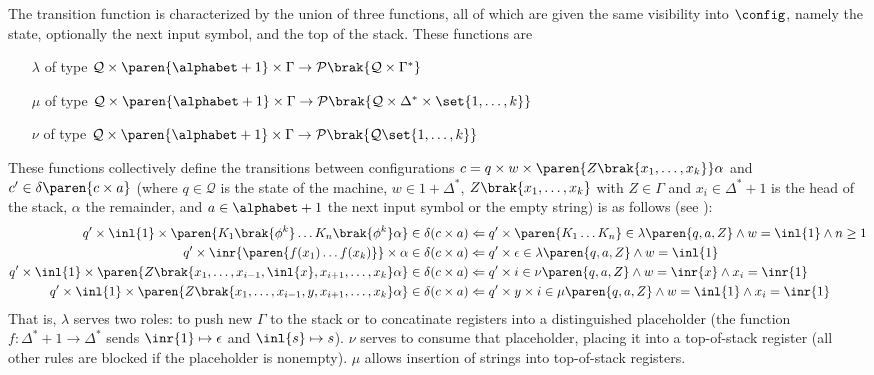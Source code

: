 The transition function is characterized by the union of three functions,
all of which are given the same visibility into $\config$, namely the state,
optionally the next input symbol, and the top of the stack.  These functions
are
%
\begin{itemize}
%
	\item[$\lambda$] of type $\mathcal{Q} \times \paren{\alphabet + 1} \times
	\Gamma \to \mathcal{P}\brak{ \mathcal{Q} \times \Gamma^* }$
%
	\item[$\mu$] of type $\mathcal{Q} \times \paren{\alphabet + 1} \times
	\Gamma \to \mathcal{P}\brak{ \mathcal{Q} \times \Delta^* \times
	\set{1,\ldots,k} }$
%
	\item[$\nu$] of type $\mathcal{Q} \times \paren{\alphabet + 1} \times
	\Gamma \to \mathcal{P}\brak{ \mathcal{Q} \set{1,\ldots,k} }$
%
\end{itemize}
%
These functions collectively define the transitions between configurations
$c = q \times w \times \paren{Z\brak{x_1,\ldots,x_k}}\alpha$ and $c' \in
\delta\paren{c \times a}$ (where $q \in \mathcal{Q}$ is the state of the
machine, $w \in 1 + \Delta^*$, $Z\brak{x_1,\ldots,x_k}$ with $Z \in \Gamma$
and $x_i \in \Delta^* + 1$ is the head of the stack, $\alpha$ the
remainder, and $a \in \alphabet + 1$ the next input symbol or the empty string)
is as follows (see \cite[p.  48]{aho:pa}):
%
\begin{align*}
	q'\times \inl{1} \times \paren{K_1\brak{\phi^k} \ldots K_n\brak{\phi^k} \alpha} \in\delta (c \times a)
%
	&\Leftarrow q' \times \paren{K_1 \ldots K_n} \in \lambda\paren{q,a, Z} \wedge w = \inl{1} \wedge n \ge 1 \\
%
	q'\times \inr{\paren{f(x_1) \ldots f(x_k)}} \times \alpha \in \delta (c \times a)
%
	&\Leftarrow q' \times \epsilon \in \lambda\paren{q,a, Z} \wedge w = \inl{1} \\
%
	q'\times \inl{1} \times \paren{Z\brak{x_1,\ldots,x_{i-1},\inl{x},x_{i+1},\ldots,x_k}\alpha} \in\delta (c \times a)
%
	&\Leftarrow q' \times i \in \nu\paren{q,a, Z} \wedge w = \inr{x} \wedge x_i = \inr{1} \\
%
	q'\times \inl{1} \times \paren{Z\brak{x_1,\ldots,x_{i-1},y,x_{i+1},\ldots,x_k}\alpha} \in\delta (c \times a)
%
	&\Leftarrow q' \times y \times i \in \mu\paren{q,a, Z} \wedge w = \inl{1} \wedge x_i = \inr{1} \\
%
\end{align*}
%
That is, $\lambda$ serves two roles: to push new $\Gamma$ to the stack or to
concatinate registers into a distinguished placeholder (the function $f :
\Delta^* + 1 \to \Delta^*$ sends $\inr{1} \mapsto \epsilon$ and $\inl{s}
\mapsto s$).  $\nu$ serves to consume that placeholder, placing it into a
top-of-stack register (all other rules are blocked if the placeholder is
nonempty).  $\mu$ allows insertion of strings into top-of-stack registers.
